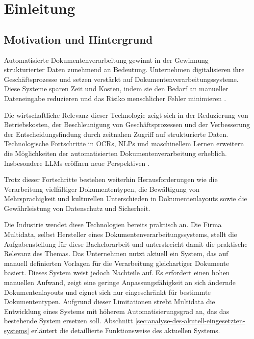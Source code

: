 \chapter{Einleitung}
\label{cha:einleitung}

\section{Motivation und Hintergrund}
\label{sec:motivation-und-hintergrund}

Automatisierte Dokumentenverarbeitung gewinnt in der Gewinnung strukturierter Daten zunehmend an Bedeutung. Unternehmen digitalisieren ihre Geschäftsprozesse und setzen verstärkt auf Dokumentenverarbeitungssysteme. Diese Systeme sparen Zeit und Kosten, indem sie den Bedarf an manueller Dateneingabe reduzieren und das Risiko menschlicher Fehler minimieren \parencite{PerotVincent2024LLMD}.

Die wirtschaftliche Relevanz dieser Technologie zeigt sich in der Reduzierung von Betriebskosten, der Beschleunigung von Geschäftsprozessen und der Verbesserung der Entscheidungsfindung durch zeitnahen Zugriff auf strukturierte Daten. Technologische Fortschritte in \glspl{OCR}, \glspl{NLP} und maschinellem Lernen erweitern die Möglichkeiten der automatisierten Dokumentenverarbeitung erheblich. Insbesondere \glspl{LLM} eröffnen neue Perspektiven \parencite{XuYiheng2020LPoT, TouvronHugo2023LOaE}.

Trotz dieser Fortschritte bestehen weiterhin Herausforderungen wie die Verarbeitung vielfältiger Dokumententypen, die Bewältigung von Mehrsprachigkeit und kulturellen Unterschieden in Dokumentenlayouts sowie die Gewährleistung von Datenschutz und Sicherheit.

Die Industrie wendet diese Technologien bereits praktisch an. Die Firma Multidata, selbst Hersteller eines Dokumentenverarbeitungssystems, stellt die Aufgabenstellung für diese Bachelorarbeit und unterstreicht damit die praktische Relevanz des Themas.
Das Unternehmen nutzt aktuell ein System, das auf manuell definierten Vorlagen für die Verarbeitung gleichartiger Dokumente basiert. Dieses System weist jedoch Nachteile auf. Es erfordert einen hohen manuellen Aufwand, zeigt eine geringe Anpassungsfähigkeit an sich ändernde Dokumentenlayouts und eignet sich nur eingeschränkt für bestimmte Dokumententypen.
Aufgrund dieser Limitationen strebt Multidata die Entwicklung eines Systems mit höherem Automatisierungsgrad an, das das bestehende System ersetzen soll. Abschnitt \ref{sec:analyse-des-akutell-eingesetzten-systems} erläutert die detaillierte Funktionsweise des aktuellen Systems.

